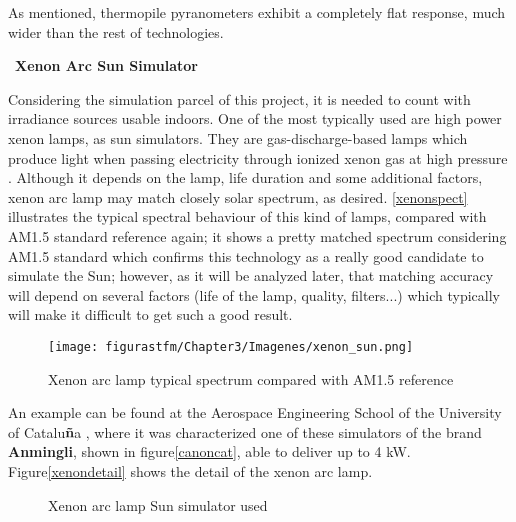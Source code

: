 				As mentioned, thermopile pyranometers exhibit a completely flat response, much wider than the rest of technologies.
			
		\textbullet\ \textbf{Xenon Arc Sun Simulator}
	

			Considering the simulation parcel of this project, it is needed to count with irradiance sources usable indoors. One of the most typically used are high power xenon lamps, as sun simulators. They are gas-discharge-based lamps which produce light when passing electricity through ionized xenon gas at high pressure \cite{wiki}. Although it depends on the lamp, life duration and some additional factors, xenon arc lamp may match closely solar spectrum, as desired. \autoref{xenonspect} illustrates the typical spectral behaviour of this kind of lamps, compared with \acrshort{AM}1.5 standard reference again; it shows a pretty matched spectrum considering \acrshort{AM}1.5 standard which confirms this technology as a really good candidate to simulate the Sun; however, as it will be analyzed later, that matching accuracy will depend on several factors (life of the lamp, quality, filters...) which typically will make it difficult to get such a good result.
			
				\begin{figure} [H] 				
				\centering
				\texttt{[image: figurastfm/Chapter3/Imagenes/xenon\_sun.png]}
				\caption{Xenon arc lamp typical spectrum compared with \acrshort{AM}1.5 reference} \label{xenonspect}
			\end{figure}
	
An example can be found at the Aerospace Engineering School of the University of Catalu\textbf{ñ}a \cite{catalan},  where it was characterized one of these simulators of the brand \textbf{Anmingli}, shown in figure\autoref{canoncat}, able to deliver up to 4 kW. Figure\autoref{xenondetail} shows the detail of the xenon arc lamp.
	
			\begin{figure}[h]
			\centering
			 \quad
			\caption{Xenon arc lamp Sun simulator used \cite{catalan}} 
\end{figure}
			
